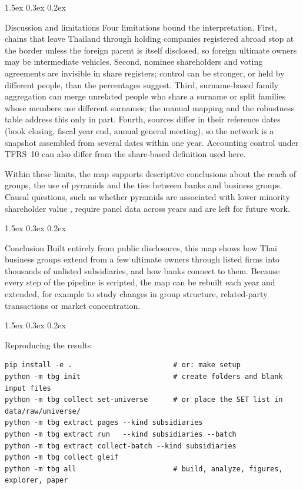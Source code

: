 \documentclass[11pt]{article}
\makeatletter
\renewcommand\section{\@startsection{section}{1}{\z@}{-2.0ex \@plus -0.5ex \@minus -0.2ex}%
  {1.5ex \@plus 0.3ex \@minus 0.2ex}{\large\bfseries\raggedright}}
\makeatother
\begin{document}
\section{Discussion and limitations}\label{sec:discussion}
Four limitations bound the interpretation. First, chains that leave Thailand through holding companies registered
abroad stop at the border unless the foreign parent is itself disclosed, so foreign ultimate owners may be
intermediate vehicles. Second, nominee shareholders and voting agreements are invisible in share registers; control
can be stronger, or held by different people, than the percentages suggest. Third, surname-based family aggregation
can merge unrelated people who share a surname or split families whose members use different surnames; the manual
mapping and the robustness table address this only in part. Fourth, sources differ in their reference dates (book
closing, fiscal year end, annual general meeting), so the network is a snapshot assembled from several dates within
one year. Accounting control under TFRS~10 can also differ from the share-based definition used here.

Within these limits, the map supports descriptive conclusions about the reach of groups, the use of pyramids and the
ties between banks and business groups. Causal questions, such as whether pyramids are associated with lower minority
shareholder value \citep{bertrand2002,masulis2011}, require panel data across years and are left for future work.

\section{Conclusion}
Built entirely from public disclosures, this map shows how Thai business groups extend from a few ultimate owners
through listed firms into thousands of unlisted subsidiaries, and how banks connect to them. Because every step of the
pipeline is scripted, the map can be rebuilt each year and extended, for example to study changes in group structure,
related-party transactions or market concentration.




\appendix
\section{Reproducing the results}
\begin{small}
\begin{verbatim}
pip install -e .                        # or: make setup
python -m tbg init                      # create folders and blank input files
python -m tbg collect set-universe      # or place the SET list in data/raw/universe/
python -m tbg extract pages --kind subsidiaries
python -m tbg extract run   --kind subsidiaries --batch
python -m tbg extract collect-batch --kind subsidiaries
python -m tbg collect gleif
python -m tbg all                       # build, analyze, figures, explorer, paper
\end{verbatim}
\end{small}
\end{document}
